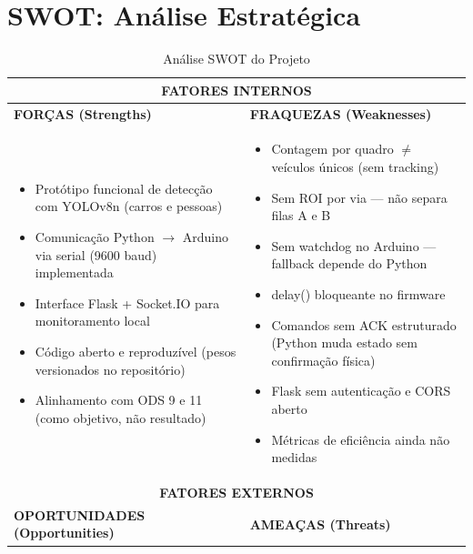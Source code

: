 \documentclass[11pt,a4paper]{article}
\begin{document}
\section{SWOT: Análise Estratégica}

\begin{table}[H]
\centering
\caption{Análise SWOT do Projeto}
\label{tab:swot}
\begin{tabular}{|p{7.2cm}|p{7.2cm}|}
\hline
\multicolumn{2}{|c|}{\cellcolor{secondarycolor!20}\textbf{FATORES INTERNOS}} \\
\hline
\textbf{FORÇAS (Strengths)} & \textbf{FRAQUEZAS (Weaknesses)} \\
\hline
\begin{minipage}[t]{7cm}
\begin{itemize}
    \item Protótipo funcional de detecção com YOLOv8n (carros e pessoas)
    \item Comunicação Python $\to$ Arduino via serial (9600 baud) implementada
    \item Interface Flask + Socket.IO para monitoramento local
    \item Código aberto e reproduzível (pesos versionados no repositório)
    \item Alinhamento com ODS 9 e 11 (como objetivo, não resultado)
\end{itemize}
\end{minipage}
&
\begin{minipage}[t]{7cm}
\begin{itemize}
    \item Contagem por quadro $\neq$ veículos únicos (sem tracking)
    \item Sem ROI por via — não separa filas A e B
    \item Sem watchdog no Arduino — fallback depende do Python
    \item delay() bloqueante no firmware
    \item Comandos sem ACK estruturado (Python muda estado sem confirmação física)
    \item Flask sem autenticação e CORS aberto
    \item Métricas de eficiência ainda não medidas
\end{itemize}
\end{minipage}
\\
\hline
\multicolumn{2}{|c|}{\cellcolor{secondarycolor!20}\textbf{FATORES EXTERNOS}} \\
\hline
\textbf{OPORTUNIDADES (Opportunities)} & \textbf{AMEAÇAS (Threats)} \\

\end{tabular}
\end{table}
\end{document}
